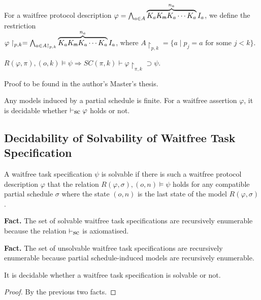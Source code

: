   \begin{definition}
   For a waitfree protocol description $\varphi = \bigwedge_{a\in A}
   \overbrace{K_a K_{\sf m} K_a \cdots K_a}^{n_a}
   I_a$, we define the restriction \\
   $\varphi\restriction_{p,k} =
   \bigwedge_{a\in A\restriction_{p,k}} \overbrace{K_a K_{\sf m} K_a \cdots K_a}^{n_a} I_a$,
   where $A\restriction_{p,k} = \{a\mid p_j = a \mbox{ for some
   } j<
   k\}$.
  \end{definition}

  \begin{lemma}
   \label{stronger}
   $R(\varphi, \pi), (o,k)\models \psi\Longrightarrow SC(\pi, k)\vdash
   \varphi\restriction_{\pi,k}\supset\psi$.
  \end{lemma}
  Proof to be found in the author's Master's thesis.

  Any models induced by a partial schedule is finite.  For a waitfree assertion $\varphi$,
  it is decidable whether $\vdash_{\mbox{\rm sc}} \varphi$ holds or not.


  \subsection{Decidability of Solvability of Waitfree Task Specification}

  \begin{definition}
   A waitfree task specification $\psi$ is solvable if there is such a
   waitfree protocol description $\varphi$ that the relation
   $R(\varphi,\sigma), (o,n)\models\psi$ holds for any compatible partial
   schedule $\sigma$ where the state $(o,n)$ is the last state of the
   model $R(\varphi,\sigma)$.
  \end{definition}

  \noindent \textbf{Fact.} The set of solvable waitfree task specifications are
  recursively enumerable because the relation $\vdash_{\mbox{\rm sc}}$ is axiomatised.

  \noindent \textbf{Fact.} The set of unsolvable waitfree task
  specifications are recursively enumerable because partial schedule-induced
  models are recursively enumerable.

  \begin{proposition}
   \label{wf-dec}
   It is decidable whether a waitfree task
   specification is solvable or not.
  \end{proposition}
  \begin{proof}
   By the previous two facts.
  \end{proof}

